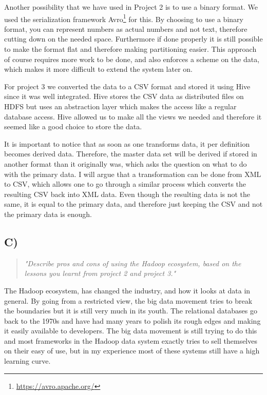Another possibility that we have used in Project 2 is to use a binary format. We used the serialization framework Avro\footnote{\url{https://avro.apache.org/}} for this. By choosing to use a binary format, you can represent numbers as actual numbers and not text, therefore cutting down on the needed space. Furthermore if done properly it is still possible to make the format flat and therefore making partitioning easier. This approach of course requires more work to be done, and also enforces a scheme on the data, which makes it more difficult to extend the system later on.

\newpar For project 3 we converted the data to a CSV format and stored it using Hive since it was well integrated. Hive stores the CSV data as distributed files on HDFS but uses an abstraction layer which makes the access like a regular database access. Hive allowed us to make all the views we needed and therefore it seemed like a good choice to store the data. 

It is important to notice that as soon as one transforms data, it per definition becomes derived data. Therefore, the master data set will be derived if stored in another format than it originally was, which asks the question on what to do with the primary data. I will argue that a transformation can be done from XML to CSV, which allows one to go through a similar process which converts the resulting CSV back into XML data. Even though the resulting data is not the same, it is equal to the primary data, and therefore just keeping the CSV and not the primary data is enough.

\subsection{C)}
\begin{quote}
	\textit{"Describe	pros	and	cons	of	using	the	Hadoop	ecosystem,	based	on	the	lessons	you	learnt	from	project	2	and	project	3."}
\end{quote}

The Hadoop ecosystem, has changed the industry, and how it looks at data in general. By going from a restricted view, the big data movement tries to break the boundaries but it is still very much in its youth. The relational databases go back to the 1970s and have had many years to polish its rough edges and making it easily available to developers. The big data movement is still trying to do this and most frameworks in the Hadoop data system exactly tries to sell themselves on their easy of use, but in my experience most of these systems still have a high learning curve. 

